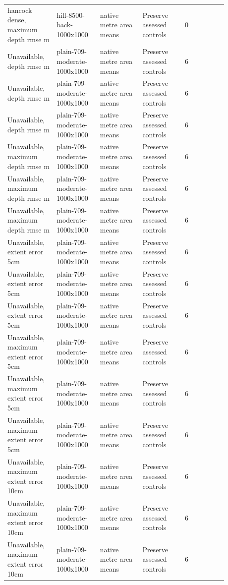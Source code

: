 \begin{longtable}{p{0.1760\linewidth}p{0.1760\linewidth}p{0.1760\linewidth}p{0.1760\linewidth}p{0.1760\linewidth}}
hancock dense, maximum depth rmse m & hill-8500-back-1000x1000 & native metre area means & Preserve assessed controls & 0 \\
Unavailable, depth rmse m & plain-709-moderate-1000x1000 & native metre area means & Preserve assessed controls & 6 \\
Unavailable, depth rmse m & plain-709-moderate-1000x1000 & native metre area means & Preserve assessed controls & 6 \\
Unavailable, depth rmse m & plain-709-moderate-1000x1000 & native metre area means & Preserve assessed controls & 6 \\
Unavailable, maximum depth rmse m & plain-709-moderate-1000x1000 & native metre area means & Preserve assessed controls & 6 \\
Unavailable, maximum depth rmse m & plain-709-moderate-1000x1000 & native metre area means & Preserve assessed controls & 6 \\
Unavailable, maximum depth rmse m & plain-709-moderate-1000x1000 & native metre area means & Preserve assessed controls & 6 \\
Unavailable, extent error 5cm & plain-709-moderate-1000x1000 & native metre area means & Preserve assessed controls & 6 \\
Unavailable, extent error 5cm & plain-709-moderate-1000x1000 & native metre area means & Preserve assessed controls & 6 \\
Unavailable, extent error 5cm & plain-709-moderate-1000x1000 & native metre area means & Preserve assessed controls & 6 \\
Unavailable, maximum extent error 5cm & plain-709-moderate-1000x1000 & native metre area means & Preserve assessed controls & 6 \\
Unavailable, maximum extent error 5cm & plain-709-moderate-1000x1000 & native metre area means & Preserve assessed controls & 6 \\
Unavailable, maximum extent error 5cm & plain-709-moderate-1000x1000 & native metre area means & Preserve assessed controls & 6 \\
Unavailable, maximum extent error 10cm & plain-709-moderate-1000x1000 & native metre area means & Preserve assessed controls & 6 \\
Unavailable, maximum extent error 10cm & plain-709-moderate-1000x1000 & native metre area means & Preserve assessed controls & 6 \\
Unavailable, maximum extent error 10cm & plain-709-moderate-1000x1000 & native metre area means & Preserve assessed controls & 6 \\

\end{longtable}
